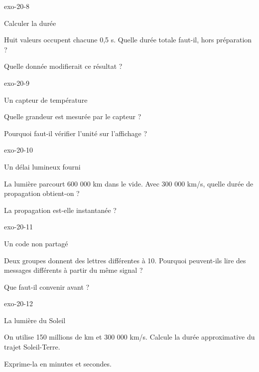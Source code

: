 \documentclass[12pt,twoside,openany]{book}
\begin{document}
\begin{blocLivre}{exo-20-8}
\begin{exercice}[2]{Calculer la durée}
\begin{questions}
\item Huit valeurs occupent chacune 0,5 s. Quelle durée totale faut-il, hors préparation ?
\item Quelle donnée modifierait ce résultat ?
\end{questions}
\end{exercice}\end{blocLivre}
\begin{blocLivre}{exo-20-9}
\begin{exercice}[2]{Un capteur de température}
\begin{questions}
\item Quelle grandeur est mesurée par le capteur ?
\item Pourquoi faut-il vérifier l’unité sur l’affichage ?
\end{questions}
\end{exercice}\end{blocLivre}
\begin{blocLivre}{exo-20-10}
\begin{exercice}[2]{Un délai lumineux fourni}
\begin{questions}
\item La lumière parcourt 600 000 km dans le vide. Avec 300 000 km/s, quelle durée de propagation obtient-on ?
\item La propagation est-elle instantanée ?
\end{questions}
\end{exercice}\end{blocLivre}
\begin{blocLivre}{exo-20-11}
\begin{exercice}[2]{Un code non partagé}
\begin{questions}
\item Deux groupes donnent des lettres différentes à 10. Pourquoi peuvent-ils lire des messages différents à partir du même signal ?
\item Que faut-il convenir avant ?
\end{questions}
\end{exercice}\end{blocLivre}
\begin{blocLivre}{exo-20-12}
\begin{exercice}[3]{La lumière du Soleil}
\begin{questions}
\item On utilise 150 millions de km et 300 000 km/s. Calcule la durée approximative du trajet Soleil-Terre.
\item Exprime-la en minutes et secondes.
\end{questions}
\end{exercice}\end{blocLivre}
\end{document}
